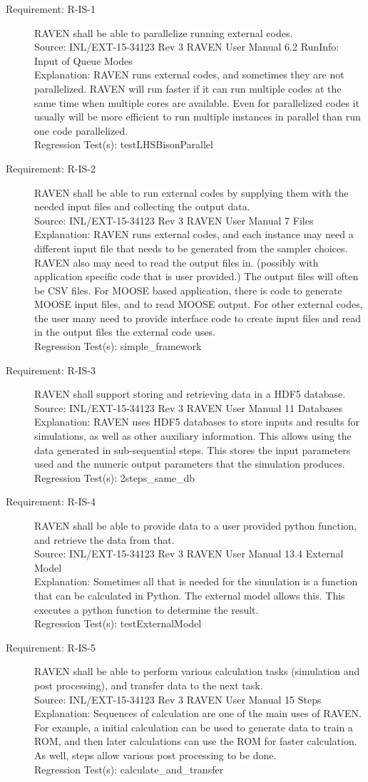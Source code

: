 \documentclass{article}
\newcommand{\requirement}[5]{\item[Requirement: #1] #2 \\Source: #3\\Explanation: #4\\Regression Test(s): #5}
\begin{document}
\begin{description}
\requirement{R-IS-1}{RAVEN shall be able to parallelize running external codes.}
{INL/EXT-15-34123 Rev 3 RAVEN User Manual 6.2 RunInfo: Input of Queue Modes}
{RAVEN runs external codes, and sometimes they are not parallelized.  RAVEN will run faster if it can run multiple codes at the same time when multiple cores are available.  Even for parallelized codes it usually will be more efficient to run multiple instances in parallel than run one code parallelized.}
{testLHSBisonParallel}

\requirement{R-IS-2}{RAVEN shall be able to run external codes by supplying them with the needed input files and collecting the output data.}
{INL/EXT-15-34123 Rev 3 RAVEN User Manual 7 Files}
{RAVEN runs external codes, and each instance may need a different input file that needs to be generated from the sampler choices.  RAVEN also may need to read the output files in. (possibly with application specific code that is user provided.)  The output files will often be CSV files.  For MOOSE based application, there is code to generate MOOSE input files, and to read MOOSE output.  For other external codes, the user many need to provide interface code to create input files and read in the output files the external code uses.}
{simple\_framework}

\requirement{R-IS-3}{RAVEN shall support storing and retrieving data in a HDF5 database.}
{INL/EXT-15-34123 Rev 3 RAVEN User Manual 11 Databases}
{RAVEN uses HDF5 databases to store inputs and results for simulations, as well as other auxiliary information.  This allows using the data generated in sub-sequential steps.  This stores the input parameters used and the numeric output parameters that the simulation produces.}
{2steps\_same\_db}

\requirement{R-IS-4}{RAVEN shall be able to provide data to a user provided python function, and retrieve the data from that.}
{INL/EXT-15-34123 Rev 3 RAVEN User Manual 13.4 External Model}
{Sometimes all that is needed for the simulation is a function that can be calculated in Python.  The external model allows this.  This executes a python function to determine the result.}
{testExternalModel}

\requirement{R-IS-5}{RAVEN shall be able to perform various calculation tasks (simulation and post processing), and transfer data to the next task.}
{INL/EXT-15-34123 Rev 3 RAVEN User Manual 15 Steps}
{Sequences of calculation are one of the main uses of RAVEN.  For example, a initial calculation can be used to generate data to train a ROM, and then later calculations can use the ROM for faster calculation.  As well, steps allow various post processing to be done.}
{calculate\_and\_transfer}


\end{description}
\end{document}
